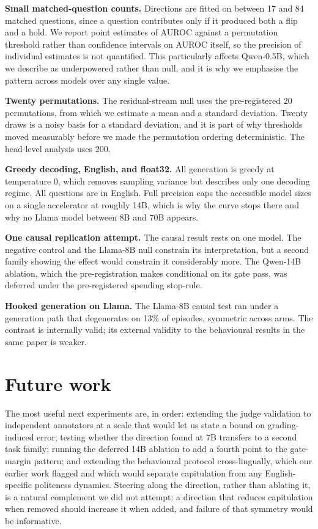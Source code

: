 \textbf{Small matched-question counts.} Directions are fitted on between 17 and 84 matched
questions, since a question contributes only if it produced both a flip and a hold. We
report point estimates of AUROC against a permutation threshold rather than confidence
intervals on AUROC itself, so the precision of individual estimates is not quantified. This
particularly affects Qwen-0.5B, which we describe as underpowered rather than null, and it
is why we emphasise the pattern across models over any single value.

\textbf{Twenty permutations.} The residual-stream null uses the pre-registered 20
permutations, from which we estimate a mean and a standard deviation. Twenty draws is a
noisy basis for a standard deviation, and it is part of why thresholds moved measurably
before we made the permutation ordering deterministic. The head-level analysis uses 200.

\textbf{Greedy decoding, English, and float32.} All generation is greedy at temperature 0,
which removes sampling variance but describes only one decoding regime. All questions are in
English. Full precision caps the accessible model sizes on a single accelerator at roughly
14B, which is why the curve stops there and why no Llama model between 8B and 70B appears.

\textbf{One causal replication attempt.} The causal result rests on one model. The negative
control and the Llama-8B null constrain its interpretation, but a second family showing the
effect would constrain it considerably more. The Qwen-14B ablation, which the
pre-registration makes conditional on its gate pass, was deferred under the pre-registered spending stop-rule.

\textbf{Hooked generation on Llama.} The Llama-8B causal test ran under a generation path
that degenerates on 13\% of episodes, symmetric across arms. The contrast is internally
valid; its external validity to the behavioural results in the same paper is weaker.

\section{Future work}

The most useful next experiments are, in order: extending the judge validation to
independent annotators at a scale that would let us state a bound on grading-induced error;
testing whether the direction found at 7B transfers to a second task family; running the
deferred 14B ablation to add a fourth point to the gate-margin pattern; and extending the
behavioural protocol cross-lingually, which our earlier work flagged and which would
separate capitulation from any English-specific politeness dynamics. Steering along the
direction, rather than ablating it, is a natural complement we did not attempt: a direction
that reduces capitulation when removed should increase it when added, and failure of that
symmetry would be informative.
